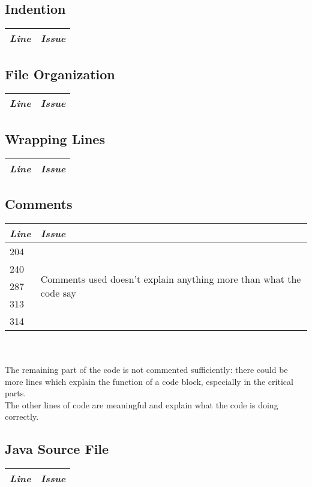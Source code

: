 \documentclass[11pt,a4paper]{report}
\begin{document}
\subsection{Indention}
\begin{tabularx}{\textwidth}{|l|X|}
	\hline
	\textit{Line} & \textit{Issue}\\
	\hline
\end{tabularx}
\subsection{File Organization}
\begin{tabularx}{\textwidth}{|l|X|}
	\hline
	\textit{Line} & \textit{Issue}\\
	\hline
\end{tabularx}
\subsection{Wrapping Lines}
\begin{tabularx}{\textwidth}{|l|X|}
	\hline
	\textit{Line} & \textit{Issue}\\
	\hline
\end{tabularx}
\subsection{Comments}
\begin{tabularx}{\textwidth}{|l|X|}
	\hline
	\textit{Line} & \textit{Issue}\\
	\hline
	204 & \multirow{5}{*}{Comments used doesn't explain anything more than what the code say}\\
	240 & \\
	287 & \\
	313 & \\
	314 & \\
	\hline
\end{tabularx}
\\\\
The remaining part of the code is not commented sufficiently: there could be more lines which explain the function of a code block, especially in the critical parts.\\The other lines of code are meaningful and explain what the code is doing correctly.
\subsection{Java Source File}
\begin{tabularx}{\textwidth}{|l|X|}
	\hline
	\textit{Line} & \textit{Issue}\\
	\hline
\end{tabularx}
\end{document}
